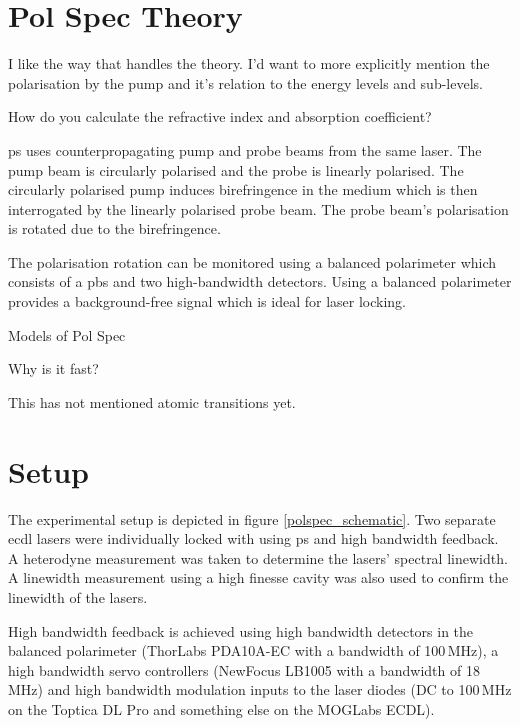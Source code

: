 \documentclass{article}
\begin{document}
\begin{multicols}{2}
\section{Pol Spec Theory}

{\color{red} I like the way that \cite{yoshikawa_frequency_2003} handles the theory. I'd want to more explicitly mention the polarisation by the pump and it's relation to the energy levels and sub-levels.

How do you calculate the refractive index and absorption coefficient?}

\Gls{ps} uses counterpropagating pump and probe beams from the same laser. The pump beam is circularly polarised and the probe is linearly polarised\cite{wieman_doppler-free_1976, demtroder_laser_2014}. The circularly polarised pump induces birefringence in the medium which is then interrogated by the linearly polarised probe beam. The probe beam's polarisation is rotated due to the birefringence.

The polarisation rotation can be monitored using a balanced polarimeter which consists of a \gls{pbs} and two high-bandwidth detectors. Using a balanced polarimeter provides a background-free signal\cite{pearman_polarization_2002} which is ideal for laser locking.

{\color{red} Models of Pol Spec \cite{do_polarization_2008, harris_polarization_2006, pearman_polarization_2002}

Why is it fast?

This has not mentioned atomic transitions yet.}

\section{Setup}

The experimental setup is depicted in figure \ref{polspec_schematic}. Two separate \gls{ecdl} lasers were individually locked with using \gls{ps} and high bandwidth feedback. A heterodyne measurement was taken to determine the lasers' spectral linewidth. A linewidth measurement using a high finesse cavity was also used to confirm the linewidth of the lasers.

High bandwidth feedback is achieved using high bandwidth detectors in the balanced polarimeter (ThorLabs PDA10A-EC with a bandwidth of 100\,MHz), a high bandwidth servo controllers (NewFocus LB1005 with a bandwidth of 18\,MHz) and high bandwidth modulation inputs to the laser diodes (DC to 100\,MHz on the Toptica DL Pro and {\color{red} something else} on the MOGLabs ECDL).


\end{multicols}
\end{document}
